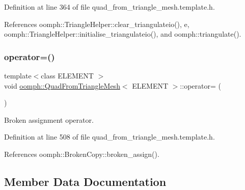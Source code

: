 Definition at line 364 of file quad\+\_\+from\+\_\+triangle\+\_\+mesh.\+template.\+h.



References oomph\+::\+Triangle\+Helper\+::clear\+\_\+triangulateio(), e, oomph\+::\+Triangle\+Helper\+::initialise\+\_\+triangulateio(), and oomph\+::triangulate().

\mbox{\label{classoomph_1_1QuadFromTriangleMesh_a873e7ed187ae267ad985e61e71e3b90c}} 
\subsubsection{\texorpdfstring{operator=()}{operator=()}}
{\footnotesize\ttfamily template$<$class E\+L\+E\+M\+E\+NT $>$ \\
void \hyperlink{classoomph_1_1QuadFromTriangleMesh}{oomph\+::\+Quad\+From\+Triangle\+Mesh}$<$ E\+L\+E\+M\+E\+NT $>$\+::operator= (\begin{DoxyParamCaption}\item[{const \hyperlink{classoomph_1_1QuadFromTriangleMesh}{Quad\+From\+Triangle\+Mesh}$<$ E\+L\+E\+M\+E\+NT $>$ \&}]{ }\end{DoxyParamCaption})\hspace{0.3cm}{\ttfamily [inline]}}



Broken assignment operator. 



Definition at line 508 of file quad\+\_\+from\+\_\+triangle\+\_\+mesh.\+template.\+h.



References oomph\+::\+Broken\+Copy\+::broken\+\_\+assign().



\subsection{Member Data Documentation}
\mbox{\label{classoomph_1_1QuadFromTriangleMesh_a4a4b155283407ae37a804d258ac8c6dd}} 
